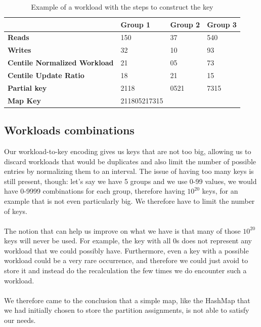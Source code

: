 \begin{table}[!htb]
  \centering
  \begin{tabular}{l l l l}
    \hline
    & \textbf{Group 1} & \textbf{Group 2} & \textbf{Group 3} \\
    \hline
    \textbf{Reads} & 150 & 37 & 540 \\
    \textbf{Writes} & 32 & 10 & 93 \\
    \hline
    \textbf{Centile Normalized Workload} & 21 & 05 & 73 \\
    \textbf{Centile Update Ratio} & 18 & 21 & 15 \\
    \textbf{Partial key} & 2118 & 0521 & 7315 \\
    \hline
    \textbf{Map Key} & 211805217315 & & \\
  \end{tabular}
  \caption{Example of a workload with the steps to construct the key}\label{tab:lru-workload-example}
\end{table}


\subsection{Workloads combinations}\label{sec:Workloads-combinations}
Our workload-to-key encoding gives us keys that are not too big, allowing us to discard workloads that would be duplicates and also limit the number of possible entries by normalizing them to an interval. The issue of having too many keys is still present, though: let's say we have 5 groups and we use 0-99 values, we would have 0-9999 combinations for each group, therefore having $10^{20}$ keys, for an example that is not even particularly big. We therefore have to limit the number of keys. 
\\\\
The notion that can help us improve on what we have is that many of those $10^{20}$ keys will never be used. For example, the key with all 0s does not represent any workload that we could possibly have. Furthermore, even a key with a possible workload could be a very rare occurrence, and therefore we could just avoid to store it and instead do the recalculation the few times we do encounter such a workload. 
\\\\
We therefore came to the conclusion that a simple map, like the HashMap that we had initially chosen to store the partition assignments, is not able to satisfy our needs.

